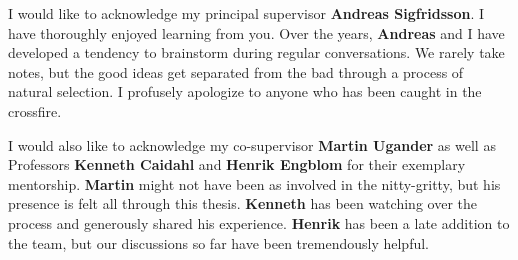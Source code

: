 \documentclass[11pt,twoside,openright]{book}
\begin{document}
\thispagestyle{empty}
\setcounter{tocdepth}{3}
\pagestyle{empty}
\tableofcontents
\clearpage
\pagestyle{plain}


{\clearpage
\pagestyle{empty}
\renewcommand{\thepage}{}
\printnomenclature
\clearpage}


\mainmatter           %
\setcounter{table}{0} %
\setcounter{page}{1}  %
 












\clearpage

\backmatter
{}
I would like to acknowledge my principal supervisor \textbf{Andreas Sigfridsson}. I have thoroughly enjoyed learning from you. Over the years, \textbf{Andreas} and I have developed a tendency to brainstorm during regular conversations. We rarely take notes, but the good ideas get separated from the bad through a process of natural selection. I profusely apologize to anyone who has been caught in the crossfire.

I would also like to acknowledge my co-supervisor \textbf{Martin Ugander} as well as Professors \textbf{Kenneth Caidahl} and \textbf{Henrik Engblom} for their exemplary mentorship. \textbf{Martin} might not have been as involved in the nitty-gritty, but his presence is felt all through this thesis. \textbf{Kenneth} has been watching over the process and generously shared his experience. \textbf{Henrik} has been a late addition to the team, but our discussions so far have been tremendously helpful. 
\end{document}
